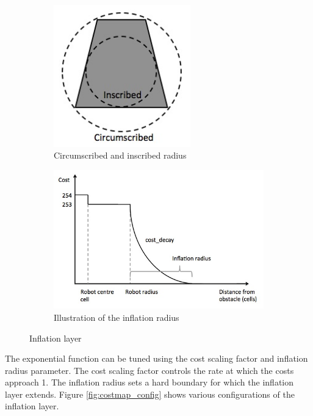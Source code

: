 \documentclass[capstone_report.tex]{subfiles}
\begin{document}
\begin{figure}[H]
    \centering
    \begin{subfigure}{0.5\textwidth}
        \centering
        \includegraphics[width=0.65\textwidth]{./imgs/circumscribed.jpg}
        \caption{Circumscribed and inscribed radius}
        \label{fig:circumscribed}
    \end{subfigure}%
    \begin{subfigure}{0.5\textwidth}
        \centering
        \includegraphics[width=1.1\textwidth]{./imgs/inflation_radius.jpg}
        \caption{Illustration of the inflation radius}
        \label{fig:inflation_radius}
    \end{subfigure}
    \caption{Inflation layer\label{fig:inflation_layer}}
\end{figure}

The exponential function can be tuned using the cost scaling factor and inflation radius parameter.  The cost scaling factor controls the rate at which the costs approach 1.  The inflation radius sets a hard boundary for which the inflation layer extends.  Figure \ref{fig:costmap_config} shows various configurations of the inflation layer.\\
\end{document}
